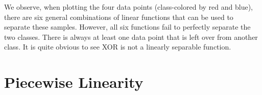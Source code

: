 \documentclass[11pt,english]{article}
\begin{document}
\begin{enumerate}
	We observe, when plotting the four data points (class-colored by red and blue), there are six general combinations of linear functions that can be used to separate these samples. However, all six functions fail to perfectly separate the two classes. There is always at least one data point that is left over from another class. It is quite obvious to see XOR is not a linearly separable function.
\end{enumerate}
\pagebreak

\section{Piecewise Linearity}

\end{document}
